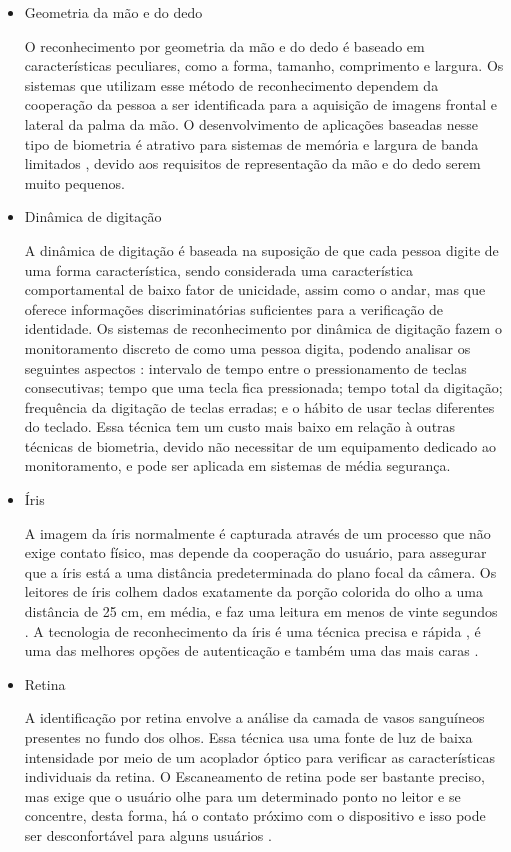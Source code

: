 \begin{itemize}
\item Geometria da mão e do dedo

  O reconhecimento por geometria da mão e do dedo é baseado em características peculiares, como a forma, tamanho, comprimento e largura. Os sistemas que utilizam esse método de reconhecimento dependem da cooperação da pessoa a ser identificada para a aquisição de imagens frontal e lateral da palma da mão. O desenvolvimento de aplicações baseadas nesse tipo de biometria é atrativo para sistemas de memória e largura de banda limitados \cite{maltoni2009handbook}, devido aos requisitos de representação da mão e do dedo serem muito pequenos.


\item Dinâmica de digitação

  A dinâmica de digitação é baseada na suposição de que cada pessoa digite de uma forma característica, sendo considerada uma característica comportamental de baixo fator de unicidade, assim como o andar, mas que oferece informações discriminatórias suficientes para a verificação de identidade. Os sistemas de reconhecimento por dinâmica de digitação fazem o monitoramento discreto de como uma pessoa digita, podendo analisar os seguintes aspectos \cite{ilonen2003keystroke}: intervalo de tempo entre o pressionamento de teclas consecutivas; tempo que uma tecla fica pressionada; tempo total da digitação; frequência da digitação de teclas erradas; e o hábito de usar teclas diferentes do teclado. Essa técnica tem um custo mais baixo em relação à outras técnicas de biometria, devido não necessitar de um equipamento dedicado ao monitoramento, e pode ser aplicada em sistemas de média segurança.  

\item Íris

  A imagem da íris normalmente é capturada através de um processo que não exige contato físico, mas depende da cooperação do usuário, para assegurar que a íris está a uma distância predeterminada do plano focal da câmera. Os leitores de íris colhem dados exatamente da porção colorida do olho a uma distância de 25 cm, em média, e faz uma leitura em menos de vinte segundos \cite{gerenciamentoid}. A tecnologia de reconhecimento da íris é uma técnica precisa e rápida \cite{maltoni2009handbook}, é uma das melhores opções de autenticação e também uma das mais caras \cite{gerenciamentoid}.

\item Retina

  A identificação por retina envolve a análise da camada de vasos sanguíneos presentes no fundo dos olhos. Essa técnica usa uma fonte de luz de baixa intensidade por meio de um acoplador óptico para verificar as características individuais da retina. O Escaneamento de retina pode ser bastante preciso, mas exige que o usuário olhe para um determinado ponto no leitor e se concentre, desta forma, há o contato próximo com o dispositivo e isso pode ser desconfortável para alguns usuários \cite{liu2001practical}. 



\end{itemize}
